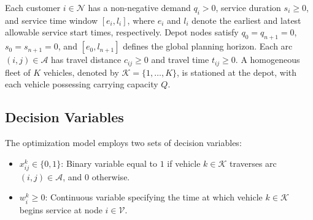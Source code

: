 \documentclass{ieeeaccess}
\begin{document}
Each customer $i \in \mathcal{N}$ has a non-negative demand $q_i > 0$, service duration $s_i \ge 0$, and service time window $[e_i, l_i]$, where $e_i$ and $l_i$ denote the earliest and latest allowable service start times, respectively. Depot nodes satisfy $q_0 = q_{n+1} = 0$, $s_0 = s_{n+1} = 0$, and $[e_0, l_{n+1}]$ defines the global planning horizon. Each arc $(i, j) \in \mathcal{A}$ has travel distance $c_{ij} \ge 0$ and travel time $t_{ij} \ge 0$. A homogeneous fleet of $K$ vehicles, denoted by $\mathcal{K} = \{1, \dots, K\}$, is stationed at the depot, with each vehicle possessing carrying capacity $Q$.

\subsection{Decision Variables}
The optimization model employs two sets of decision variables:
\begin{itemize}
    \item $x_{ij}^k \in \{0, 1\}$: Binary variable equal to $1$ if vehicle $k \in \mathcal{K}$ traverses arc $(i, j) \in \mathcal{A}$, and $0$ otherwise.
    \item $w_i^k \ge 0$: Continuous variable specifying the time at which vehicle $k \in \mathcal{K}$ begins service at node $i \in \mathcal{V}$.
\end{itemize}
\end{document}
